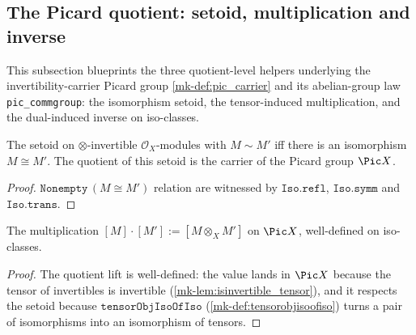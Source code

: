 \subsection{The Picard quotient: setoid, multiplication and inverse}
\label{mk-subsec:tensorobj_pic_quotient_helpers}

This subsection blueprints the three quotient-level helpers underlying the
invertibility-carrier Picard group \ref{mk-def:pic_carrier} and its abelian-group law
\texttt{pic\_commgroup}: the isomorphism setoid, the tensor-induced multiplication, and
the dual-induced inverse on iso-classes.

\begin{definition}\label{mk-def:pic_setoid}
  \leanok

  The setoid on \(\otimes\)-invertible \(\mathcal{O}_X\)-modules with \(M \sim M'\) iff there
  is an isomorphism \(M \cong M'\). The quotient of this setoid is the carrier of the Picard
  group \(\Pic X\).
\end{definition}
\begin{proof}
  \leanok
  \(\mathtt{Nonempty}\,(M \cong M')\) relation are witnessed by \(\mathtt{Iso.refl}\),
  \(\mathtt{Iso.symm}\) and \(\mathtt{Iso.trans}\).
\end{proof}

\begin{definition}\label{mk-def:pic_mul}
  \leanok

  The multiplication \([M] \cdot [M'] := [M \otimes_X M']\) on \(\Pic X\), well-defined on
  iso-classes.
\end{definition}
\begin{proof}
  \leanok
The quotient lift is well-defined: the value lands in \(\Pic X\)
  because the tensor of invertibles is invertible (\ref{mk-lem:isinvertible_tensor}), and it
  respects the setoid because \(\mathtt{tensorObjIsoOfIso}\) (\ref{mk-def:tensorobjisoofiso})
  turns a pair of isomorphisms into an isomorphism of tensors.
\end{proof}

